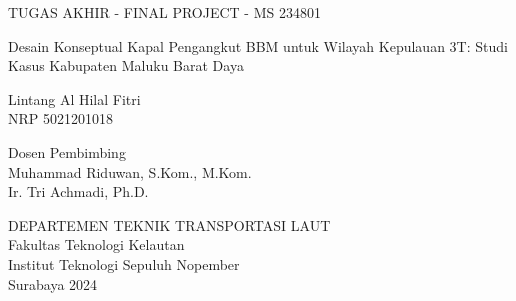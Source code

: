TUGAS AKHIR - FINAL PROJECT - MS 234801

\vspace{6ex}

\begin{large}
  Desain Konseptual Kapal Pengangkut BBM untuk Wilayah Kepulauan 3T:  Studi Kasus Kabupaten Maluku Barat Daya
\end{large}

\vspace{4ex}

Lintang Al Hilal Fitri \\
NRP 5021201018

\vspace{2ex}

Dosen Pembimbing \\
Muhammad Riduwan, S.Kom., M.Kom. \\
Ir. Tri Achmadi, Ph.D.

\vspace{6ex}

DEPARTEMEN TEKNIK TRANSPORTASI LAUT \\
Fakultas Teknologi Kelautan \\
Institut Teknologi Sepuluh Nopember \\
Surabaya 2024
